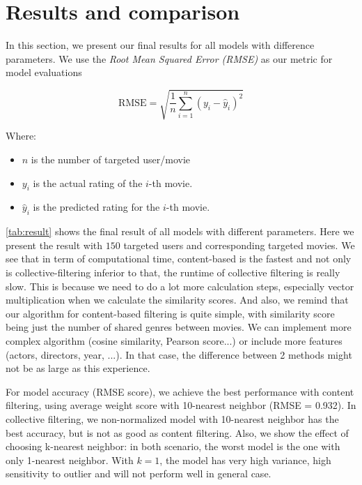 \documentclass{article}
\begin{document}
\section{Results and comparison}

In this section, we present our final results for all models with difference parameters. We use the \textit{Root Mean Squared Error (RMSE)} as our metric for model evaluations

\[
\text{RMSE} = \sqrt{\frac{1}{n} \sum_{i=1}^{n} (y_i - \hat{y}_i)^2}
\]

Where:

\begin{itemize}
    \item \( n \) is the number of targeted user/movie
    \item \( y_i \) is the actual rating of the \( i \)-th movie.
    \item \( \hat{y}_i \) is the predicted rating for the \( i \)-th movie.
\end{itemize}



\autoref{tab:result} shows the final result of all models with different parameters. Here we present the result with $150$ targeted users and corresponding targeted movies. We see that in term of computational time, content-based is the fastest and not only is collective-filtering inferior to that, the runtime of collective filtering is really slow. This is because we need to do a lot more calculation steps, especially vector multiplication when we calculate the similarity scores. And also, we remind that our algorithm for content-based filtering is quite simple, with similarity score being just the number of shared genres between movies. We can implement more complex algorithm (cosine similarity, Pearson score...) or include more features (actors, directors, year, ...). In that case, the difference between 2 methods might not be as large as this experience. 

For model accuracy (RMSE score), we achieve the best performance with content filtering, using average weight score with 10-nearest neighbor (RMSE = 0.932). In collective filtering, we non-normalized model with 10-nearest neighbor has the best accuracy, but is not as good as content filtering. Also, we show the effect of choosing k-nearest neighbor: in both scenario, the worst model is the one with only 1-nearest neighbor. With $k = 1$, the model has very high variance, high sensitivity to outlier and will not perform well in general case.  
\end{document}
